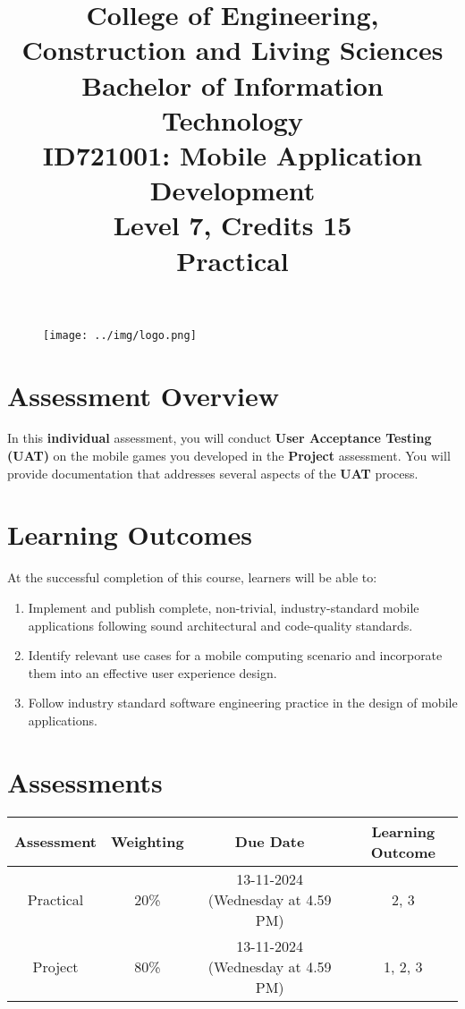 \documentclass{article}
\author{}
\begin{document}
 

\begin{figure}
	\centering
	\texttt{[image: ../img/logo.png]}
\end{figure} 

\title{College of Engineering, Construction and Living Sciences\\Bachelor of Information Technology\\ID721001: Mobile Application Development\\Level 7, Credits 15\\\textbf{Practical}}
\date{}
\maketitle

\section*{Assessment Overview}
In this \textbf{individual} assessment, you will conduct \textbf{User Acceptance Testing (UAT)} on the mobile games you developed in the \textbf{Project} assessment. You will provide documentation that addresses several aspects of the \textbf{UAT} process. 

\section*{Learning Outcomes}
At the successful completion of this course, learners will be able to:
\begin{enumerate}
	\item Implement and publish complete, non-trivial, industry-standard mobile applications following sound architectural and code-quality standards.
	\item Identify relevant use cases for a mobile computing scenario and incorporate them into an effective user experience design.
	\item Follow industry standard software engineering practice in the design of mobile applications.
\end{enumerate}

\section*{Assessments}
\renewcommand{\arraystretch}{1.5}
\begin{tabular}{|c|c|c|c|}
	\hline
	\textbf{Assessment}                                 & \textbf{Weighting} & \textbf{Due Date}            & \textbf{Learning Outcome} \\ \hline
	\small Practical & \small 20\%        & \small 13-11-2024 (Wednesday at 4.59 PM)   & \small 2, 3                   \\ \hline
	\small Project                 & \small 80\%        & \small 13-11-2024 (Wednesday at 4.59 PM) \small  & \small 1, 2, 3                   \\ \hline
\end{tabular}
\end{document}
